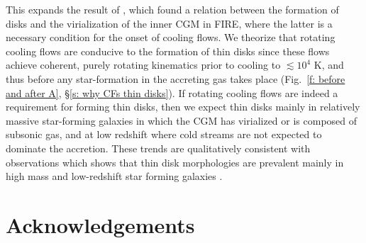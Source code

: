 \documentclass[fleqn,usenatbib]{mnras}
\begin{document}
\begin{enumerate}
    This expands the result of \cite{Stern2021}, which found a relation between the formation of disks and the virialization of the inner CGM in FIRE, where the latter is a necessary condition for the onset of cooling flows. 
    We theorize that rotating cooling flows are conducive to the formation of thin disks since these flows achieve coherent, purely rotating kinematics prior to cooling to $\lesssim10^4$ K, and thus before any star-formation in the accreting gas takes place (Fig.~\ref{f: before and after A}, \S\ref{s: why CFs thin disks}).
    If rotating cooling flows are indeed a requirement for forming thin disks, then we expect thin disks mainly in relatively massive star-forming galaxies in which the CGM has virialized or is composed of subsonic gas, and at low redshift where cold streams are not expected to dominate the accretion.
    These trends are qualitatively consistent with observations which shows that thin disk morphologies are prevalent mainly in high mass and low-redshift star forming galaxies \citep{Kassin2012, Simons2017}. 
\end{enumerate}

\section*{Acknowledgements}
\end{document}

